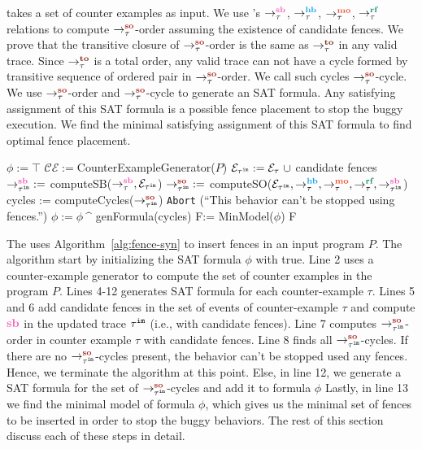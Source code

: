 \ourtechnique takes a set of counter examples as input.
We use \cc 's $\setSB$, $\setHB$, $\setMO$, $\setRF$ relations to compute 
$ \setSO $-order assuming the existence of candidate fences.
We prove that the transitive closure of $ \setSO $-order is the same as 
$ \setTO $ in any valid \cc trace. 
Since $ \setTO $ is a total order, any valid \cc trace can not have a 
cycle formed by transitive sequence of ordered pair in $ \setSO $-order. 
We call such cycles $\setSO$-cycle. 
We use $ \setSO $-order and $ \setSO $-cycle to generate an SAT formula. 
Any satisfying assignment of this SAT formula is a possible fence 
placement to stop the buggy execution. We find the minimal satisfying assignment of this SAT formula to find optimal fence placement. 

\begin{algorithm}
	\caption{\ourtechnique}
	\begin{algorithmic}[1]	
		\State $\phi := \top$
		\State $ \mathcal{CE} := $CounterExampleGenerator($P$)
			\State $ \events_{\im{\tau}} := \events_\tau\ \union $ candidate fences
			\State $ \seqb{\im{\tau}}{}{} := $ computeSB($\setSB, \events_{\im{\tau}}$) \State $ \so{\tau^{\mathtt{im}}}{}{} := $ computeSO($\events_{\im{\tau}}, \setHB, \setMO, \setRF, \seqb{\im{\tau}}{}{}$)
			\State cycles := computeCycles($ \so{\im{\tau}}{}{} $)
				\State \texttt{Abort} (``This behavior can't be stopped using \cc fences.'')
				\State \Return
			\EndIf
			\State $\phi := \phi\ \^ $ genFormula(cycles)
		\EndFor
		\State F:= MinModel($ \phi $)
		\State \Return F
%		
		\EndProcedure
		\label{alg:fence-syn}
	\end{algorithmic}
\end{algorithm}

The \ourtool uses Algorithm~\ref{alg:fence-syn} to insert fences in an 
input program $ P $. The algorithm start by initializing the 
SAT formula $ \phi $ with true.  Line 2 uses a counter-example generator 
to compute the set of counter examples in the program $ P $. 
Lines 4-12 generates SAT formula for each counter-example $ \tau $.
Lines 5 and 6 add candidate fences in the set of events of counter-example 
$ \tau $ and compute $ \lsb $ in the updated trace $ {\tau}^{\mathtt{im}} $ (i.e., with candidate 
fences). 
Line 7 computes $ \so{\im{\tau}}{}{} $-order in counter example $ \tau $ with candidate fences.
Line 8 finds all $ \so{\im{\tau}}{}{} $-cycles. If there are no $ \so{\im{\tau}}{}{} $-cycles 
present, the behavior can't be stopped used any \cc fences. Hence, we 
terminate the algorithm at this point.
Else, in line 12, we generate a SAT formula for the set of $ \so{\im{\tau}}{}{} $-cycles and add it to formula $ \phi $
Lastly, in line 13 we find the minimal model of formula $ \phi $, which 
gives us the minimal set of fences to be inserted in order to stop the 
buggy behaviors.
The rest of this section discuss each of these steps in detail.

